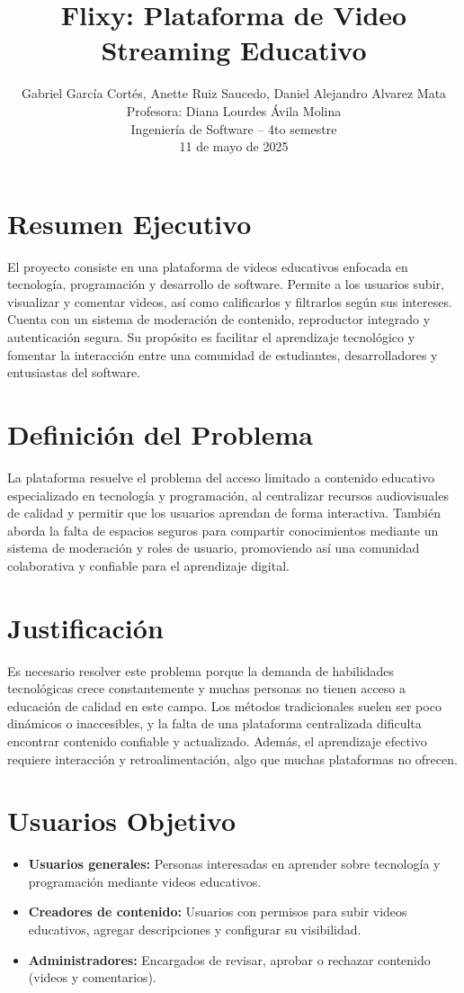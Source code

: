 \documentclass[12pt]{article}
\title{Flixy: Plataforma de Video Streaming Educativo}
\author{Gabriel García Cortés, Anette Ruiz Saucedo, Daniel Alejandro Alvarez Mata \\
\small Profesora: Diana Lourdes Ávila Molina \\
\small Ingeniería de Software – 4to semestre \\
\small 11 de mayo de 2025}
\date{}
\begin{document}
\maketitle
\tableofcontents
\newpage

\section{Resumen Ejecutivo}
El proyecto consiste en una plataforma de videos educativos enfocada en tecnología, programación y desarrollo de software. Permite a los usuarios subir, visualizar y comentar videos, así como calificarlos y filtrarlos según sus intereses. Cuenta con un sistema de moderación de contenido, reproductor integrado y autenticación segura. Su propósito es facilitar el aprendizaje tecnológico y fomentar la interacción entre una comunidad de estudiantes, desarrolladores y entusiastas del software.

\section{Definición del Problema}
La plataforma resuelve el problema del acceso limitado a contenido educativo especializado en tecnología y programación, al centralizar recursos audiovisuales de calidad y permitir que los usuarios aprendan de forma interactiva. También aborda la falta de espacios seguros para compartir conocimientos mediante un sistema de moderación y roles de usuario, promoviendo así una comunidad colaborativa y confiable para el aprendizaje digital.

\section{Justificación}
Es necesario resolver este problema porque la demanda de habilidades tecnológicas crece constantemente y muchas personas no tienen acceso a educación de calidad en este campo. Los métodos tradicionales suelen ser poco dinámicos o inaccesibles, y la falta de una plataforma centralizada dificulta encontrar contenido confiable y actualizado. Además, el aprendizaje efectivo requiere interacción y retroalimentación, algo que muchas plataformas no ofrecen.

\section{Usuarios Objetivo}
\begin{itemize}
  \item \textbf{Usuarios generales:} Personas interesadas en aprender sobre tecnología y programación mediante videos educativos.
  \item \textbf{Creadores de contenido:} Usuarios con permisos para subir videos educativos, agregar descripciones y configurar su visibilidad.
  \item \textbf{Administradores:} Encargados de revisar, aprobar o rechazar contenido (videos y comentarios).
\end{itemize}
\end{document}
